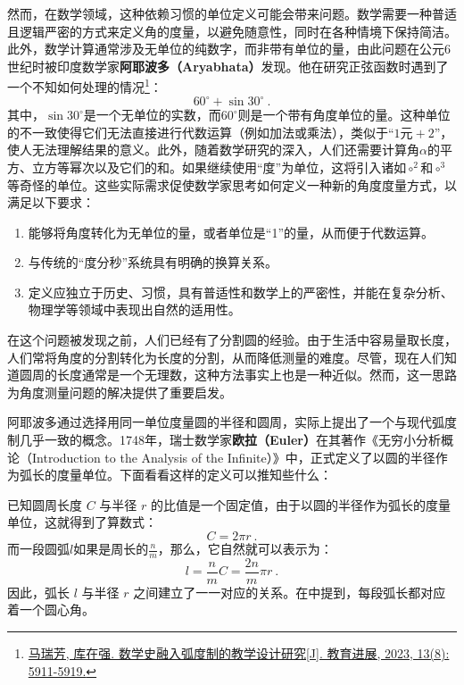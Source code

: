 然而，在数学领域，这种依赖习惯的单位定义可能会带来问题。数学需要一种普适且逻辑严密的方式来定义角的度量，以避免随意性，同时在各种情境下保持简洁。此外，数学计算通常涉及无单位的纯数字，而非带有单位的量，由此问题在公元6世纪时被印度数学家\textbf{阿耶波多（Aryabhata）}发现。他在研究正弦函数时遇到了一个不知如何处理的情况\footnote{\href{https://www.hanspub.org/journal/PaperInformation?paperID=71063&utm_source=chatgpt.com}{马瑞芳, 库在强. 数学史融入弧度制的教学设计研究[J]. 教育进展, 2023, 13(8): 5911-5919.}}：
\begin{equation}
60^\circ+\sin30^\circ~.
\end{equation}
其中，$\sin 30^\circ$是一个无单位的实数，而$60^\circ$则是一个带有角度单位的量。这种单位的不一致使得它们无法直接进行代数运算（例如加法或乘法），类似于“$1\text{元} + 2$”，使人无法理解结果的意义。此外，随着数学研究的深入，人们还需要计算角$\alpha$的平方、立方等幂次以及它们的和。如果继续使用“度”为单位，这将引入诸如$\circ^2$和$\circ^3$等奇怪的单位。这些实际需求促使数学家思考如何定义一种新的角度度量方式，以满足以下要求：
\begin{enumerate}
\item 能够将角度转化为无单位的量，或者单位是“1”的量，从而便于代数运算。
\item 与传统的“度分秒”系统具有明确的换算关系。
\item 定义应独立于历史、习惯，具有普适性和数学上的严密性，并能在复杂分析、物理学等领域中表现出自然的适用性。
\end{enumerate}

在这个问题被发现之前，人们已经有了分割圆的经验。由于生活中容易量取长度，人们常将角度的分割转化为长度的分割，从而降低测量的难度。尽管，现在人们知道圆周的长度通常是一个无理数，这种方法事实上也是一种近似。然而，这一思路为角度测量问题的解决提供了重要启发。

阿耶波多通过选择用同一单位度量圆的半径和圆周，实际上提出了一个与现代弧度制几乎一致的概念。1748年，瑞士数学家\textbf{欧拉（Euler）}在其著作《无穷小分析概论（Introduction to the Analysis of the Infinite）》中，正式定义了以圆的半径作为弧长的度量单位。下面看看这样的定义可以推知些什么：

已知圆周长度 $C$ 与半径 $r$ 的比值是一个固定值，由于以圆的半径作为弧长的度量单位，这就得到了算数式：
\begin{equation}
C=2\pi r~.
\end{equation}
而一段圆弧$l$如果是周长的$\displaystyle\frac{n}{m}$，那么，它自然就可以表示为：
\begin{equation}
l=\frac{n}{m}C=\frac{2n}{m}\pi r~.
\end{equation}
因此，弧长 $l$ 与半径 $r$ 之间建立了一一对应的关系。在中提到，每段弧长都对应着一个圆心角。

